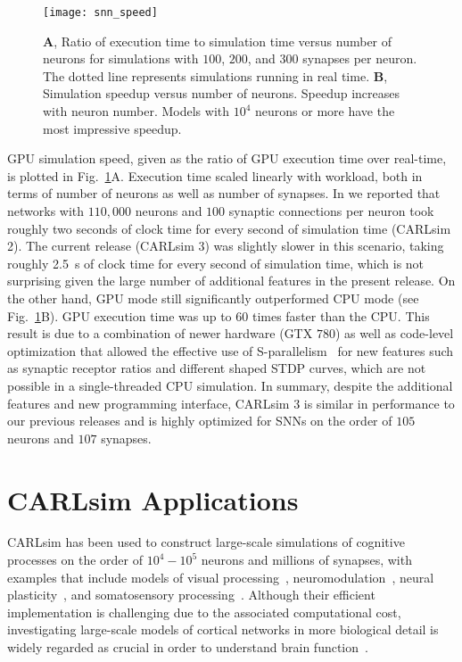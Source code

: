 \begin{figure}[t]
  \centering
  \texttt{[image: snn\_speed]}
  \caption{\textbf{A}, Ratio of execution time to simulation time versus
  number of neurons for simulations with $100$, $200$, and $300$
  synapses per neuron. The dotted line represents simulations running
  in real time.
  \textbf{B}, Simulation speedup versus number of neurons. Speedup
  increases with neuron number. Models with $10^4$ neurons or more have
  the most impressive speedup.}
  \label{fig:SNN|performance}
\end{figure}

\ac{GPU} simulation speed, given as the ratio of \ac{GPU} execution
time over real-time, is plotted in Fig.~\ref{fig:SNN|performance}A.
Execution time
scaled linearly with workload, both in terms of number of
neurons as well as number of synapses.
In \citet{Richert2011}
we reported that networks with $110,000$ neurons and $100$
synaptic connections per neuron took roughly two seconds of
clock time for every second of simulation time (CARLsim 2).
The current release (CARLsim 3) was slightly slower in this
scenario, taking roughly \SI{2.5}{\second} of clock time for every
second of simulation time, which is not surprising given the
large number of additional features in the present release. On
the other hand, \ac{GPU} mode still significantly outperformed
\ac{CPU} mode (see Fig.~\ref{fig:SNN|performance}B).
\ac{GPU} execution time was up to $60$
times faster than the CPU. This result is due to a combination
of newer hardware (GTX $780$) as well as code-level
optimization that allowed the effective use of
S-parallelism~\citep{Nageswaran2009}
for new features such as synaptic receptor ratios and different
shaped \ac{STDP} curves, which are not possible in a single-threaded
\ac{CPU} simulation. In summary, despite the additional
features and new programming interface, CARLsim 3 is
similar in performance to our previous releases and is highly
optimized for \acp{SNN} on the order of $105$ neurons and $107$
synapses.



\section{CARLsim Applications}
\label{sec:SNN|applications}
CARLsim has been used to construct large-scale
simulations of cognitive processes on the order of $10^4 - 10^5$
neurons and millions of synapses, with examples that include
models of visual
processing~\citep{Richert2011,Beyeler2013,Beyeler2014,Beyeler2015b},
neuromodulation~\citep{Avery2012,Avery2015},
neural plasticity~\citep{Carlson2013},
and somatosensory processing~\citep{Chou2015}.
Although their efficient implementation
is challenging due to the associated computational cost,
investigating large-scale models of cortical networks in more
biological detail is widely regarded as crucial in order to
understand brain function~\citep{Honey2007}.

